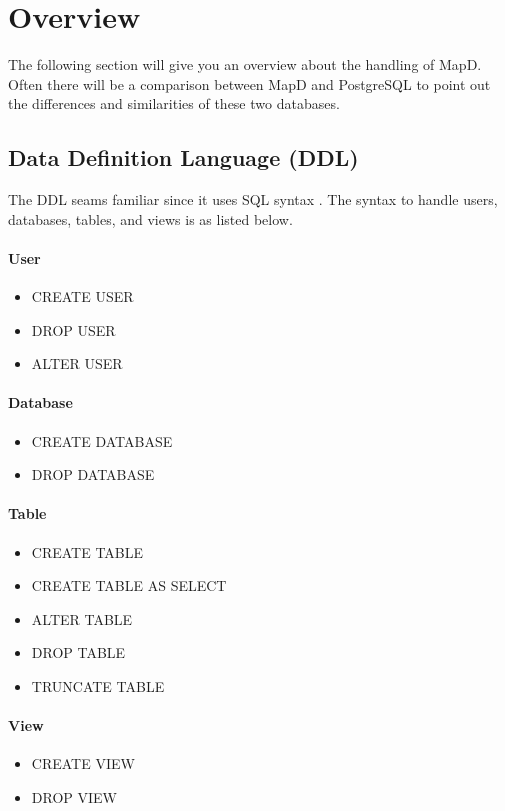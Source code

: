 \newpage
\section{Overview}

The following section will give you an overview about the handling of MapD.
Often there will be a comparison between MapD and PostgreSQL to point out the differences and similarities of these two databases.



\subsection{Data Definition Language (DDL)}
The DDL seams familiar since it uses SQL syntax \cite{ddl}.
The syntax to handle users, databases, tables, and views is as listed below.

\paragraph{User}
\begin{itemize}
 \item CREATE USER
 \item DROP USER
 \item ALTER USER
\end{itemize}

\paragraph{Database}
\begin{itemize}
 \item CREATE DATABASE
 \item DROP DATABASE
\end{itemize}


\paragraph{Table}
\begin{itemize}
 \item CREATE TABLE
 \item CREATE TABLE AS SELECT
 \item ALTER TABLE
 \item DROP TABLE
 \item TRUNCATE TABLE
\end{itemize}

\paragraph{View}
\begin{itemize}
 \item CREATE VIEW
 \item DROP VIEW
\end{itemize}


